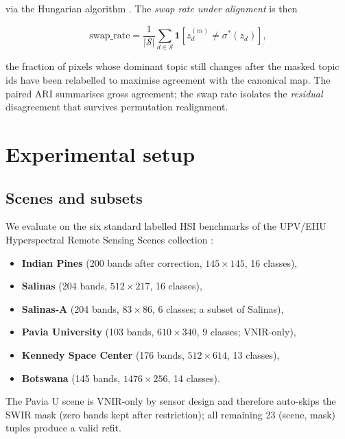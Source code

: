 \documentclass[conference,a4paper,10pt]{IEEEtran}
\begin{document}
\noindent via the Hungarian algorithm
\cite{kuhn1955hungarian,scipy_assignment}. The
\emph{swap rate under alignment} is then

\begin{equation}
\text{swap\_rate} = \frac{1}{|\mathcal{S}|}
\sum_{d \in \mathcal{S}}
\mathbf{1}[z^{(m)}_d \neq \sigma^*(z_d)],
\label{eq:swap-rate}
\end{equation}

\noindent the fraction of pixels whose dominant topic still changes
after the masked topic ids have been relabelled to maximise agreement
with the canonical map. The paired ARI summarises gross agreement;
the swap rate isolates the \emph{residual} disagreement that survives
permutation realignment.

\section{Experimental setup}
\label{sec:setup}

\subsection{Scenes and subsets}

We evaluate on the six standard labelled HSI benchmarks of the
UPV/EHU Hyperspectral Remote Sensing Scenes collection
\cite{baumgardner1992indianpines,aviris_salinas,rosis_pavia,aviris_ksc,eo1_botswana}:

\begin{itemize}
\item \textbf{Indian Pines} (200 bands after correction,
$145 \times 145$, 16 classes),
\item \textbf{Salinas} (204 bands, $512 \times 217$, 16 classes),
\item \textbf{Salinas-A} (204 bands, $83 \times 86$, 6 classes;
a subset of Salinas),
\item \textbf{Pavia University} (103 bands, $610 \times 340$,
9 classes; VNIR-only),
\item \textbf{Kennedy Space Center} (176 bands, $512 \times 614$,
13 classes),
\item \textbf{Botswana} (145 bands, $1476 \times 256$, 14 classes).
\end{itemize}

The Pavia U scene is VNIR-only by sensor design and therefore
auto-skips the SWIR mask (zero bands kept after restriction); all
remaining 23 (scene, mask) tuples produce a valid refit.
\end{document}
